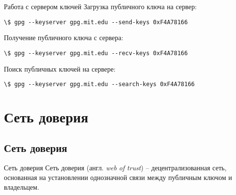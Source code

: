 \documentclass[presentation]{beamer}
\begin{document}
\begin{frame}[fragile]{Работа с сервером ключей}
  Загрузка публичного ключа на сервер:
  \begin{Verbatim}[commandchars=\\\[\]]
\$ gpg --keyserver gpg.mit.edu --send-keys 0xF4A78166
  \end{Verbatim}

  Получение публичного ключа с сервера:
  \begin{Verbatim}[commandchars=\\\[\]]
\$ gpg --keyserver gpg.mit.edu --recv-keys 0xF4A78166
  \end{Verbatim}

  Поиск публичных ключей на сервере:
  \begin{Verbatim}[commandchars=\\\[\]]
\$ gpg --keyserver gpg.mit.edu --search-keys 0xF4A78166
  \end{Verbatim}
\end{frame}



\section{Сеть доверия}

\subsection{Сеть доверия}

\begin{frame}{Сеть доверия}
  \raisebox{-.30em}{\Large\HandRight}\hspace{.25em} Сеть доверия
  (англ. \emph{web of trust}) -- децентрализованная сеть, основанная
  на установлении однозначной связи между публичным ключом и
  владельцем.
\end{frame}
\end{document}

